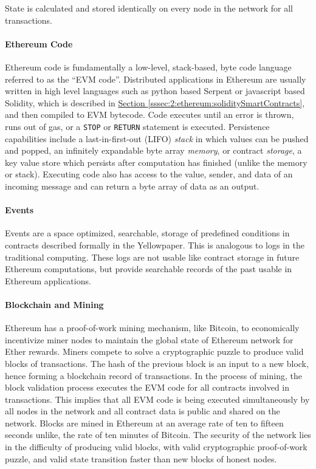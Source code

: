\documentclass[a4paper,12pt]{article} %
\newcommand{\hypersectionref}[1]{\hyperref[#1]{Section \ref{#1}}}
\def\code#1{\texttt{#1}}
\begin{document}
State is calculated and stored identically on every node in the network for all transactions.

\paragraph*{Ethereum Code}

Ethereum code is fundamentally a low-level, stack-based, byte code language referred to as the ``EVM code''. Distributed applications in Ethereum are usually written in high level languages such as python based Serpent\cite{serpent} or javascript based Solidity, which is described in \hypersectionref{sssec:2:ethereum:soliditySmartContracts}, and then compiled to EVM bytecode. Code executes until an error is thrown, runs out of gas, or a \code{STOP} or \code{RETURN} statement is executed. Persistence capabilities include a last-in-first-out (LIFO) \textit{stack} in which values can be pushed and popped, an infinitely expandable byte array \textit{memory}, or contract \textit{storage}, a key value store which persists after computation has finished (unlike the memory or stack). Executing code also has access to the value, sender, and data of an incoming message and can return a byte array of data as an output.

\paragraph*{Events}
Events are a space optimized, searchable, storage of predefined conditions in contracts described formally in the Yellowpaper\cite{yellowpaper}. This is analogous to logs in the traditional computing. These logs are not usable like contract storage in future Ethereum computations, but provide searchable records of the past usable in Ethereum applications.

\paragraph*{Blockchain and Mining}

Ethereum has a proof-of-work mining mechanism, like Bitcoin, to economically incentivize miner nodes to maintain the global state of Ethereum network for Ether rewards. Miners compete to solve a cryptographic puzzle to produce valid blocks of transactions. The hash of the previous block is an input to a new block, hence forming a blockchain record of transactions. In the process of mining, the block validation process executes the EVM code for all contracts involved in transactions. This implies that all EVM code is being executed simultaneously by all nodes in the network and all contract data is public and shared on the network. Blocks are mined in Ethereum at an average rate of ten to fifteen seconds unlike, the rate of ten minutes of Bitcoin. The security of the network lies in the difficulty of producing valid blocks, with valid cryptographic proof-of-work puzzle, and valid state transition faster than new blocks of honest nodes.
\end{document}
